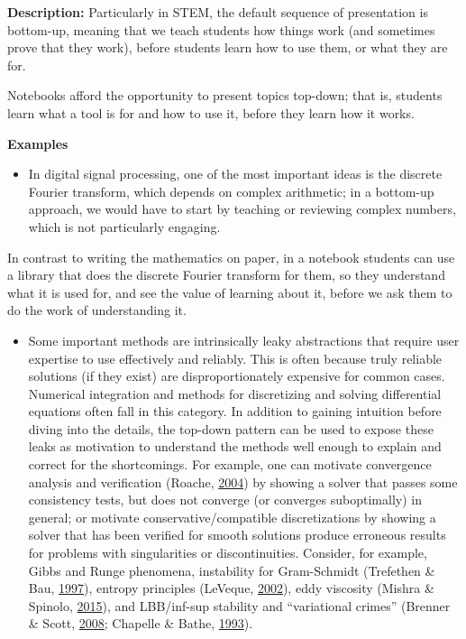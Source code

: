 \documentclass[]{book}
\providecommand{\tightlist}{%
  \setlength{\itemsep}{0pt}\setlength{\parskip}{0pt}}
\begin{document}
\textbf{Description:} Particularly in STEM, the default sequence of
presentation is bottom-up, meaning that we teach students how things
work (and sometimes prove that they work), before students learn how to
use them, or what they are for.

Notebooks afford the opportunity to present topics top-down; that is,
students learn what a tool is for and how to use it, before they learn
how it works.

\textbf{Examples}

\begin{itemize}
\tightlist
\item
  In digital signal processing, one of the most important ideas is the
  discrete Fourier transform, which depends on complex arithmetic; in a
  bottom-up approach, we would have to start by teaching or reviewing
  complex numbers, which is not particularly engaging.
\end{itemize}

In contrast to writing the mathematics on paper, in a notebook students
can use a library that does the discrete Fourier transform for them, so
they understand what it is used for, and see the value of learning about
it, before we ask them to do the work of understanding it.

\begin{itemize}
\tightlist
\item
  Some important methods are intrinsically leaky abstractions that
  require user expertise to use effectively and reliably. This is often
  because truly reliable solutions (if they exist) are
  disproportionately expensive for common cases. Numerical integration
  and methods for discretizing and solving differential equations often
  fall in this category. In addition to gaining intuition before diving
  into the details, the top-down pattern can be used to expose these
  leaks as motivation to understand the methods well enough to explain
  and correct for the shortcomings. For example, one can motivate
  convergence analysis and verification (Roache,
  \protect\hyperlink{ref-roache2004bpc}{2004}) by showing a solver that
  passes some consistency tests, but does not converge (or converges
  suboptimally) in general; or motivate conservative/compatible
  discretizations by showing a solver that has been verified for smooth
  solutions produce erroneous results for problems with singularities or
  discontinuities. Consider, for example, Gibbs and Runge phenomena,
  instability for Gram-Schmidt (Trefethen \& Bau,
  \protect\hyperlink{ref-trefethen1997numerical}{1997}), entropy
  principles (LeVeque, \protect\hyperlink{ref-leveque2002finite}{2002}),
  eddy viscosity (Mishra \& Spinolo,
  \protect\hyperlink{ref-mishra2015accurate}{2015}), and LBB/inf-sup
  stability and ``variational crimes'' (Brenner \& Scott,
  \protect\hyperlink{ref-brenner2008mathematical}{2008}; Chapelle \&
  Bathe, \protect\hyperlink{ref-chapelle1993inf}{1993}).
\end{itemize}
\end{document}
